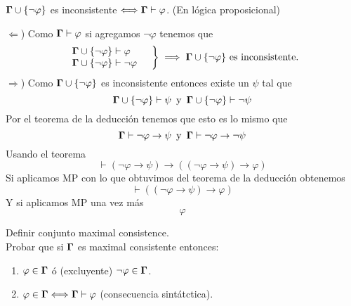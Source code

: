 \documentclass[leqno, 12pt, twoside,letterpaper]{book}
\begin{document}
\begin{ej}{1}
    $\bm{\Gamma} \cup \{ \lnot\varphi \}$ es inconsistente $\Longleftrightarrow \bm{\Gamma} \vdash \varphi$. (En lógica proposicional)
\end{ej}

\begin{solucion}

$\Leftarrow$) Como $\bm{\Gamma} \vdash \varphi$ si agregamos $\lnot\varphi$ tenemos que
	 \[\left. \begin{array}{ll} \bm{\Gamma} \cup \{ \lnot\varphi \} \vdash \varphi & \\ \bm{\Gamma} \cup \{ \lnot\varphi \} \vdash \lnot\varphi \end{array} \right\} \implies \bm{\Gamma}\cup\{ \lnot\varphi \} \mbox{ es inconsistente.}\]
$\Rightarrow$) Como $\bm{\Gamma} \cup \{ \lnot\varphi \}$ es inconsistente entonces existe un $\psi$ tal que
\[ \bm{\Gamma} \cup \{ \lnot\varphi \} \vdash \psi \mbox{\, y \,} \bm{\Gamma} \cup \{ \lnot\varphi \} \vdash \lnot \psi \]
Por el teorema de la deducción tenemos que esto es lo mismo que
\[ \bm{\Gamma} \vdash \lnot\varphi \rightarrow \psi \mbox{\, y \,}
   \bm{\Gamma} \vdash \lnot\varphi \rightarrow \lnot \psi \]
Usando el teorema
\[ \vdash (\lnot\varphi \rightarrow \psi) \rightarrow ((\lnot\varphi \rightarrow \psi) \rightarrow \varphi) \]
Si aplicamos MP con lo que obtuvimos del teorema de la deducción obtenemos
\[ \vdash ((\lnot\varphi \rightarrow \psi) \rightarrow \varphi) \]
Y si aplicamos MP una vez más
\[ \varphi \]
\end{solucion}

\begin{ej}{2}
    Definir conjunto maximal consistence. \\
    Probar que si $\bm{\Gamma}$ es maximal consistente entonces:
    \begin{enumerate}
        \item $\varphi \in \bm{\Gamma}$ ó (excluyente) $\lnot\varphi \in \bm{\Gamma}$.
        \item $\varphi \in \bm{\Gamma} \Longleftrightarrow \bm{\Gamma} \vdash \varphi$ (consecuencia sintátctica).
    \end{enumerate}
\end{ej}
\end{document}
